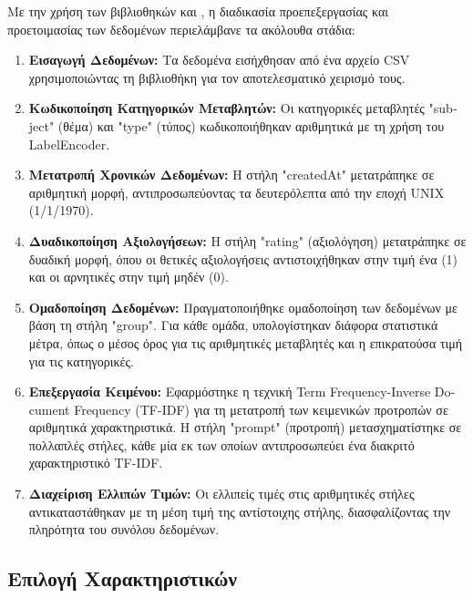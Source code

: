 Με την χρήση των βιβλιοθηκών  και
, η διαδικασία προεπεξεργασίας και προετοιμασίας
των δεδομένων περιελάμβανε τα ακόλουθα στάδια:
\begin{enumerate}
  \item
    \textbf{Εισαγωγή Δεδομένων:} Τα δεδομένα εισήχθησαν από ένα αρχείο CSV
    χρησιμοποιώντας τη βιβλιοθήκη  για τον αποτελεσματικό
    χειρισμό τους.
  \item
    \textbf{Κωδικοποίηση Κατηγορικών Μεταβλητών:} Οι κατηγορικές
    μεταβλητές "\textlatin{subject}" (θέμα) και "\textlatin{type}" (τύπος)
    κωδικοποιήθηκαν αριθμητικά με τη χρήση του \textlatin{LabelEncoder}.

  \item
    \textbf{Μετατροπή Χρονικών Δεδομένων:} Η στήλη \textlatin{"createdAt"}
    μετατράπηκε σε αριθμητική μορφή, αντιπροσωπεύοντας τα δευτερόλεπτα από
    την εποχή \textlatin{UNIX} (1/1/1970).

  \item
    \textbf{Δυαδικοποίηση Αξιολογήσεων:} Η στήλη \textlatin{"rating"}
    (αξιολόγηση) μετατράπηκε σε δυαδική μορφή, όπου οι θετικές
    αξιολογήσεις αντιστοιχήθηκαν στην τιμή ένα (1) και οι αρνητικές στην
    τιμή μηδέν (0).

  \item
    \textbf{Ομαδοποίηση Δεδομένων:} Πραγματοποιήθηκε ομαδοποίηση των
    δεδομένων με βάση τη στήλη \textlatin{"group"}. Για κάθε ομάδα,
    υπολογίστηκαν διάφορα στατιστικά μέτρα, όπως ο μέσος όρος για τις
    αριθμητικές μεταβλητές και η επικρατούσα τιμή για τις κατηγορικές.

  \item
    \textbf{Επεξεργασία Κειμένου:} Εφαρμόστηκε η τεχνική \textlatin{Term
    Frequency-Inverse Document Frequency (TF-IDF)} για τη μετατροπή των
    κειμενικών προτροπών σε αριθμητικά χαρακτηριστικά. Η στήλη
    \textlatin{"prompt"} (προτροπή) μετασχηματίστηκε σε πολλαπλές στήλες,
    κάθε μία εκ των οποίων αντιπροσωπεύει ένα διακριτό χαρακτηριστικό
    \textlatin{TF-IDF}.

  \item
    \textbf{Διαχείριση Ελλιπών Τιμών:} Οι ελλιπείς τιμές στις αριθμητικές
    στήλες αντικαταστάθηκαν με τη μέση τιμή της αντίστοιχης στήλης,
    διασφαλίζοντας την πληρότητα του συνόλου δεδομένων.
\end{enumerate}

\subsection{Επιλογή Χαρακτηριστικών}

